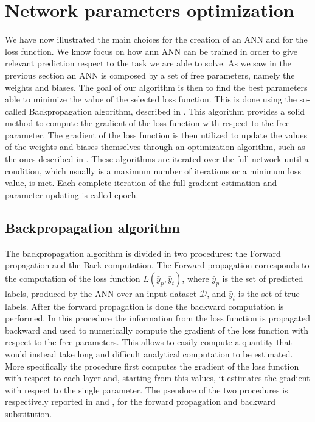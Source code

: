 
\section{Network parameters optimization}\label{weightoptimization}

We have now illustrated the main choices for the creation of an ANN and for the loss function. We know focus on how ann ANN can be trained in order to give relevant prediction respect to the task we are able to solve. 
As we saw in the previous section an ANN is composed by a set of free parameters, namely the weights and biases. The goal of our algorithm is then to find the best parameters able to minimize the value of the selected loss function. This is done using the so-called Backpropagation algorithm, described in . This algorithm provides a solid method to compute the gradient of the loss function with respect to the free parameter. The gradient of the loss function is then utilized to update the values of the weights and biases themselves through an optimization algorithm, such as the ones described in .
These algorithms are iterated over the full network until a condition, which usually is a maximum number of iterations or a minimum loss value, is met. Each complete iteration of the full gradient estimation and parameter updating is called epoch.

\subsection{Backpropagation algorithm}\label{backprop}

The backpropagation algorithm is divided in two procedures: the Forward propagation and the Back computation.
The Forward propagation corresponds to the computation of the loss function $L(\bar{y}_p, \bar{y}_t)$, where $\bar{y}_p$ is the set of predicted labels, produced by the ANN over an input dataset $\mathcal{D}$, and $\bar{y}_t$ is the set of true labels. 
After the forward propagation is done the backward computation is performed. In this procedure the information from the loss function is propagated backward and used to numerically compute the gradient of the loss function with respect to the free parameters. This allows to easily compute a quantity that would instead take long and difficult analytical computation to be estimated.
More specifically the procedure first computes the gradient of the loss function with respect to each layer and, starting from this values, it estimates the gradient with respect to the single parameter.
The pseudoce of the two procedures is respectively reported  in  and , for the forward propagation and backward substitution. 

